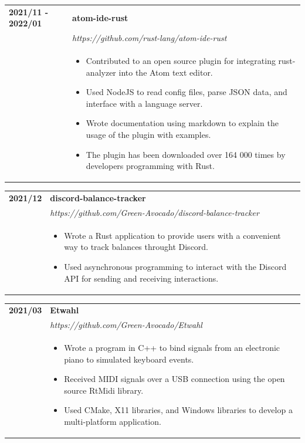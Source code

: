 \documentclass[letterpaper]{article}
\begin{document}
        \begin{tabular}{p{} p{}}
            \textbf{2021/11 - 2022/01} & \textbf{atom-ide-rust} \\
            & \emph{https://github.com/rust-lang/atom-ide-rust} \\
            & \begin{itemize}
                \item Contributed to an open source plugin for integrating rust-analyzer into the Atom
                    text editor.
                \item Used NodeJS to read config files, parse JSON data, and interface with a language
                    server.
                \item Wrote documentation using markdown to explain the usage of the plugin with examples.
                \item The plugin has been downloaded over 164 000 times by developers programming with
                    Rust.
            \end{itemize}
            \\
        \end{tabular}

        \begin{tabular}{p{} p{}}
            \textbf{2021/12} & \textbf{discord-balance-tracker} \\
            & \emph{https://github.com/Green-Avocado/discord-balance-tracker} \\
            & \begin{itemize}
                \item Wrote a Rust application to provide users with a convenient way to track balances
                    throught Discord.
                \item Used asynchronous programming to interact with the Discord API for sending and
                    receiving interactions.
            \end{itemize}
            \\
        \end{tabular}

        \begin{tabular}{p{} p{}}
            \textbf{2021/03} & \textbf{Etwahl} \\
            & \emph{https://github.com/Green-Avocado/Etwahl} \\
            & \begin{itemize}
                \item Wrote a program in C++ to bind signals from an electronic piano to simulated
                    keyboard events.
                \item Received MIDI signals over a USB connection using the open source RtMidi library.
                \item Used CMake, X11 libraries, and Windows libraries to develop a multi-platform
                    application.
            \end{itemize}
            \\
        \end{tabular}
\end{document}
